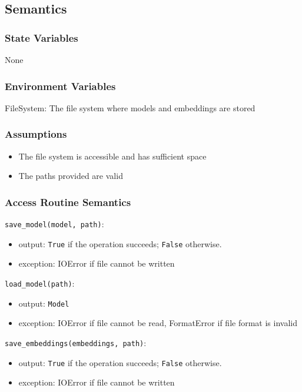 \documentclass[12pt, titlepage]{article}
\begin{document}
\subsection{Semantics}

\subsubsection{State Variables}
None

\subsubsection{Environment Variables}

FileSystem: The file system where models and embeddings are stored

\subsubsection{Assumptions}

\begin{itemize}
  \item The file system is accessible and has sufficient space
  \item The paths provided are valid
\end{itemize}

\subsubsection{Access Routine Semantics}

\noindent \texttt{save\_model(model, path)}:
\begin{itemize}
\item output:  \texttt{True} if the operation succeeds; \texttt{False} otherwise.
\item exception: IOError if file cannot be written
\end{itemize}

\noindent \texttt{load\_model(path)}:
\begin{itemize}
\item output: \texttt{Model}
\item exception: IOError if file cannot be read, FormatError if file format is invalid
\end{itemize}

\noindent \texttt{save\_embeddings(embeddings, path)}:
\begin{itemize}
\item output: \texttt{True} if the operation succeeds; \texttt{False} otherwise.
\item exception: IOError if file cannot be written
\end{itemize}
\end{document}
